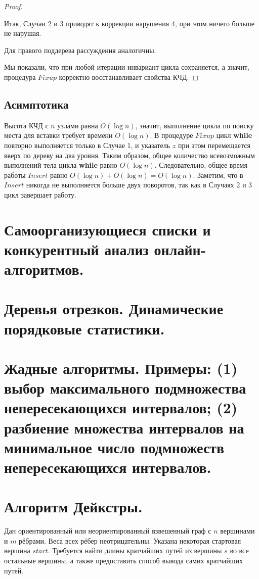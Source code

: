 \documentclass[a4paper,12pt]{article}
\begin{document}
\begin{proof}
\begin{itemize}
\begin{enumerate}
            Итак, Случаи 2 и 3 приводят к коррекции нарушения 4, при этом ничего больше не нарушая.
        \end{enumerate}
    \end{itemize}
    
    Для правого поддерева рассуждения аналогичны.
    
    Мы показали, что при любой итерации инвариант цикла сохраняется, а значит, процедура $Fixup$ корректно восстанавливает свойства КЧД.
\end{proof}

\subsection{Асимптотика}

Высота КЧД с $n$ узлами равна $O(\log n)$, значит, выполнение цикла по поиску места для вставки требует времени $O(\log n)$. В процедуре $Fixup$ цикл \textbf{while} повторно выполняется только в Случае 1, и указатель $z$ при этом перемещается вверх по дереву на два уровня. Таким образом, общее количество всевозможным выполнений тела цикла \textbf{while} равно $O(\log n)$. Следовательно, общее время работы $Insert$ равно $O(\log n) + O(\log n) = O(\log n)$. Заметим, что в $Insert$ никогда не выполняется больше двух поворотов, так как в Случаях 2 и 3 цикл завершает работу.
\newpage
\section{Самоорганизующиеся списки и конкурентный анализ онлайн-алгоритмов.}
\newpage
\section{Деревья отрезков. Динамические порядковые статистики.}
\newpage
\section{Жадные алгоритмы. Примеры: (1) выбор максимального подмножества непересекающихся интервалов; (2) разбиение множества интервалов на минимальное число подмножеств непересекающихся интервалов.}
\newpage
\section{Алгоритм Дейкстры.}

\begin{on1n}
Дан ориентированный или неориентированный взвешенный граф с $n$ вершинами и $m$ рёбрами. Веса всех рёбер неотрицательны. Указана некоторая стартовая вершина $start$. Требуется найти длины кратчайших путей из вершины $s$ во все остальные вершины, а также предоставить способ вывода самих кратчайших путей.
\end{on1n}
\end{document}

